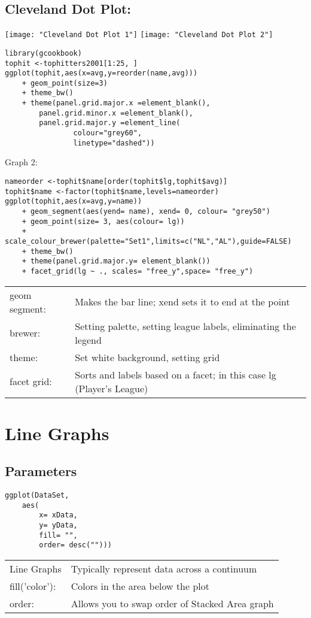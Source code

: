 \documentclass[]{article}
\begin{document}
\subsection{Cleveland Dot Plot:}
\texttt{[image: "Cleveland Dot Plot 1"]}
\texttt{[image: "Cleveland Dot Plot 2"]}
\begin{verbatim}
library(gcookbook)
tophit <-tophitters2001[1:25, ] 
ggplot(tophit,aes(x=avg,y=reorder(name,avg))) 
	+ geom_point(size=3) 
	+ theme_bw() 
	+ theme(panel.grid.major.x =element_blank(), 
		panel.grid.minor.x =element_blank(), 
		panel.grid.major.y =element_line(
				colour="grey60",
				linetype="dashed"))
\end{verbatim}
Graph 2:
\begin{verbatim}
nameorder <-tophit$name[order(tophit$lg,tophit$avg)]
tophit$name <-factor(tophit$name,levels=nameorder)
ggplot(tophit,aes(x=avg,y=name)) 
	+ geom_segment(aes(yend= name), xend= 0, colour= "grey50") 
	+ geom_point(size= 3, aes(colour= lg)) 
	+ scale_colour_brewer(palette="Set1",limits=c("NL","AL"),guide=FALSE) 
	+ theme_bw() 
	+ theme(panel.grid.major.y= element_blank()) 
	+ facet_grid(lg ~ ., scales= "free_y",space= "free_y")
\end{verbatim}
\begin{tabular}{l l}
	geom segment: & Makes the bar line; xend sets it to end at the point \\
	brewer: 	& Setting palette, setting league labels, eliminating the legend \\
	theme: 		& Set white background, setting grid \\
	facet grid: & Sorts and labels based on a facet; in this case lg (Player's League) \\
\end{tabular}

\section{Line Graphs}

\subsection{Parameters}
\begin{verbatim}
ggplot(DataSet, 
	aes(
		x= xData, 
		y= yData, 
		fill= "", 
		order= desc("")))
\end{verbatim}
\begin{tabular}{l l}
	Line Graphs & Typically represent data across a continuum \\
	fill('color'): & Colors in the area below the plot \\
	order: & Allows you to swap order of Stacked Area graph \\
\end{tabular}
\end{document}
